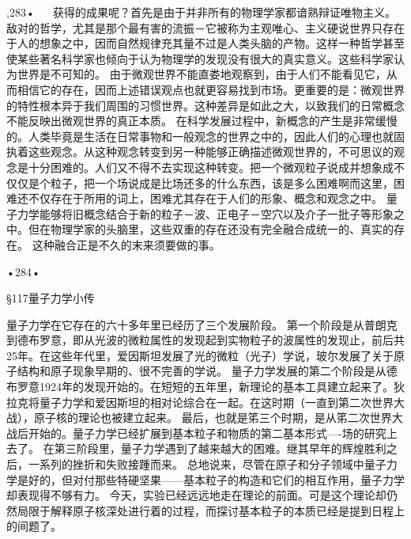 ,283•
  
获得的成果呢？首先是由于并非所有的物理学家都谙熟辩证唯物主义。敌对的哲学，尤其是那个最有害的流振－它被称为主观唯心、主义硬说世界只存在于人的想象之中，因而自然规律充其量不过是人类头脑的产物。这样一种哲学甚至使某些著名科学家也倾向于认为物理学的发现没有很大的真实意义。这些科学家认为世界是不可知的。
由于微观世界不能直娄地观察到，由于人们不能看见它，从而相信它的存在，因而上述错误观点也就更容易找到市场。更重要的是：微观世界的特性根本异于我们周围的习惯世界。这种差异是如此之大，以致我们的日常概念不能反映出微观世界的真正本质。
在科学发展过程中，新概念的产生是非常缓慢的。人类毕竟是生活在日常事物和一般观念的世界之中的，因此人们的心理也就固执着这些观念。从这种观念转变到另一种能够正确描述微观世界的，不可思议的观念是十分困难的。人们又不得不去实现这种转变。把一个微观粒子说成并想象成不仅仅是个粒子，把一个场说成是比场还多的什么东西，该是多么困难啊而这里，困难还不仅存在于所用的词上，困难尤其存在于人们的形象、概念和观念之中。
量子力学能够将旧概念结合于新的粒子－波、正电子－空穴以及介子一批子等形象之中。但在物理学家的头脑里，这些双重的存在还没有完全融合成统一的、真实的存在。
这种融合正是不久的末来须要做的事。

•284•
 
§117量子力学小传

量子力学在它存在的六十多年里已经历了三个发展阶段。
第一个阶段是从普朗克到德布罗意，即从光波的微粒属性的发现起到实物粒子的波属性的发现止，前后共25年。在这些年代里，爱因斯坦发展了光的微粒（光子）学说，玻尔发展了关于原子结构和原子现象早期的、很不完善的学说。
量子力学发展的第二个阶段是从德布罗意1924年的发现开始的。在短短的五年里，新理论的基本工具建立起来了。狄拉克将量子力学和爱因斯坦的相对论综合在一起。在这时期（一直到第二次世界大战），原子核的理论也被建立起来。
最后，也就是笫三个时期，是从笫二次世界大战后开始的。量子力学已经扩展到基本粒子和物质的第二基本形式—-场的研究上去了。
在第三阶段里，量子力学遇到了越来越大的困难。继其早年的辉煌胜利之后，一系列的挫折和失败接踵而来。
总地说来，尽管在原子和分子领域中量子力学是好的，但对付那些特硬坚果——基本粒子的构造和它们的相互作用，量子力学却表现得不够有力。
今天，实验已经远远地走在理论的前面。可是这个理论却仍然局限于解释原子核深处进行着的过程，而探讨基本粒子的本质已经是提到日程上的间题了。

